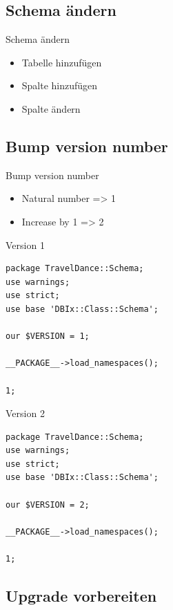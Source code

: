 \subsection{Schema ändern}

\begin{frame}{Schema ändern}
\begin{itemize}
\item Tabelle hinzufügen
\item Spalte hinzufügen
\item Spalte ändern
\end{itemize}
\end{frame}

\subsection{Bump version number}
\begin{frame}{Bump version number}
\begin{itemize}
\item Natural number => 1
\item Increase by 1 => 2
\end{itemize}
\end{frame}

\begin{frame}[fragile]{Version 1}
\begin{lstlisting}
package TravelDance::Schema;
use warnings;
use strict;
use base 'DBIx::Class::Schema';

our $VERSION = 1;

__PACKAGE__->load_namespaces();

1;
\end{lstlisting}
\end{frame}

\begin{frame}[fragile]{Version 2}
\begin{lstlisting}
package TravelDance::Schema;
use warnings;
use strict;
use base 'DBIx::Class::Schema';

our $VERSION = 2;

__PACKAGE__->load_namespaces();

1;
\end{lstlisting}
\end{frame}

\subsection{Upgrade vorbereiten}


